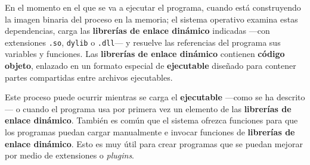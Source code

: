 En el momento en el que se va a ejecutar el programa, cuando está
construyendo la imagen binaria del proceso en la memoria; el sistema
operativo examina estas dependencias, carga las \textbf{librerías de
enlace dinámico}{} indicadas ---con extensiones \texttt{.so},
\texttt{dylib} o \texttt{.dll}--- y resuelve las referencias del
programa sus variables y funciones. Las \textbf{librerías de enlace
dinámico} contienen \textbf{código objeto}, enlazado en un formato
especial de \textbf{ejecutable} diseñado para contener partes
compartidas entre archivos ejecutables.

Este proceso puede ocurrir mientras se carga el \textbf{ejecutable}
---como se ha descrito--- o cuando el programa usa por primera vez un
elemento de las \textbf{librerías de enlace dinámico}. También es común
que el sistema ofrezca funciones para que los programas puedan cargar
manualmente e invocar funciones de \textbf{librerías de enlace
dinámico}. Esto es muy útil para crear programas que se puedan mejorar
por medio de extensiones o \emph{plugins}.

